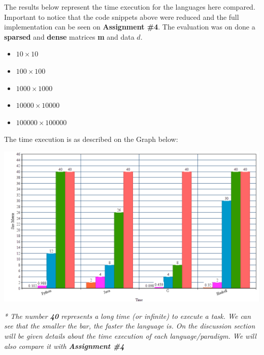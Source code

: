 \documentclass[conference]{IEEEtran}
\begin{document}
The results below represent the time execution for the languages here compared. Important to notice that the code snippets above were reduced and the full implementation can be seen on \textbf{Assignment \#4}. The evaluation was on done a \textbf{sparsed} and \textbf{dense} matrices \textbf{m} and data $d$.

\begin{itemize}
\item $10\times10$
\item $100\times100$
\item $1000\times1000$
\item $10000\times10000$
\item $100000\times100000$
\end{itemize} 

The time execution is as described on the Graph below:

\includegraphics[scale=0.25]{graph_codes}

\small{\textit{* The number \textbf{40} represents a long time (or infinite) to execute a task. 
We can see that the smaller the bar, the faster the language is. On the discussion section will be given details about the time execution of each language/paradigm. We will also compare it with \textbf{Assignment \#4} }}
\end{document}
